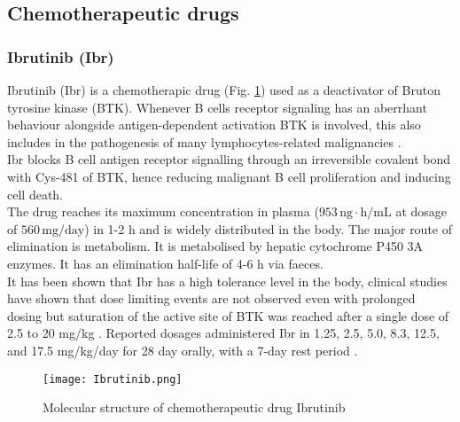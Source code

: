 \subsection{Chemotherapeutic drugs}
\subsubsection{Ibrutinib (Ibr)}
Ibrutinib (Ibr) is a chemotherapic drug (Fig. \ref{fig:Ibr}) used as a deactivator of Bruton tyrosine kinase (BTK). Whenever B cells receptor signaling has an aberrhant behaviour alongside antigen-dependent activation BTK is involved, this also includes in the pathogenesis of many lymphocytes-related malignancies \cite{ibr-1}.\\
Ibr blocks B cell antigen receptor signalling through an irreversible covalent bond with Cys-481 of BTK, hence reducing malignant B cell proliferation and inducing cell death.\\
The drug reaches its maximum concentration in plasma ($953\,\text{ng}\cdot\text{h}/\text{mL}$ at dosage of $560\,\text{mg}/\text{day}$) in 1-2 h and is widely distributed in the body. The major route of elimination is metabolism. It is metabolised by hepatic cytochrome P450 3A enzymes. It has an elimination half-life of 4-6 h via faeces.\\
It has been shown that Ibr has a high tolerance level in the body, clinical studies have shown that dose limiting events are not observed even with prolonged dosing \cite{ibr-2} but saturation of the active site of BTK was reached after a single dose of 2.5 to 20 mg/kg \cite{ibr-pubchem}. Reported dosages administered Ibr in 1.25, 2.5, 5.0, 8.3, 12.5, and 17.5 mg/kg/day for 28 day orally, with a 7-day rest period \cite{ibr-2}.
\begin{figure}[htbp!]
	\centering
	\texttt{[image: Ibrutinib.png]}
	\caption{Molecular structure of chemotherapeutic drug Ibrutinib}
	\label{fig:Ibr}
\end{figure}

